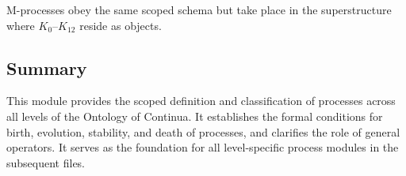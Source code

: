 M-processes obey the same scoped schema but take place in the
superstructure where $K_0$--$K_{12}$ reside as objects.

\subsection{Summary}

This module provides the scoped definition and classification of processes
across all levels of the Ontology of Continua.  
It establishes the formal conditions for birth, evolution, stability,
and death of processes, and clarifies the role of general operators.
It serves as the foundation for all level-specific process modules in
the subsequent files.
